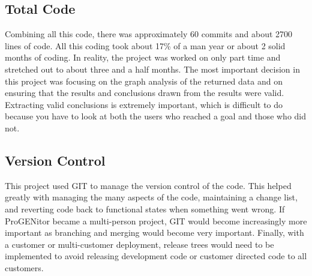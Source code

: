 \subsection{Total Code}
Combining all this code, there was approximately 60 commits and about 2700 lines
of code.  All this coding took about 17\% of a man year or about 2 solid months
of coding.  In reality, the project was worked on only part time and stretched
out to about three and a half months.  The most important decision in this
project was focusing on the graph analysis of the returned data and on ensuring
that the results and conclusions drawn from the results were valid. 
Extracting valid conclusions is extremely important, which is difficult to do
because you have to look at both the users who reached a goal and those who did
not.
\subsection{Version Control}
This project used GIT to manage the version control of the code.  This helped
greatly with managing the many aspects of the code, maintaining a change list,
and reverting code back to functional states when something went wrong.  If
ProGENitor became a multi-person project, GIT would become increasingly more
important as branching and merging would become very important.  Finally,
with a customer or multi-customer deployment, release trees would need to be
implemented to avoid releasing development code or customer directed code to all
customers.
